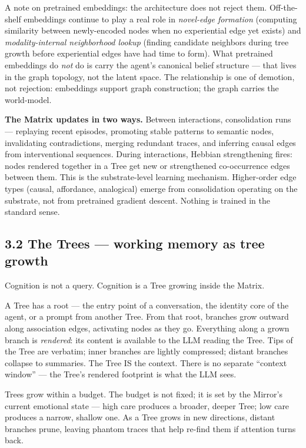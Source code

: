 \documentclass[12pt]{article}
\begin{document}
A note on pretrained embeddings: the architecture does not reject them. Off-the-shelf embeddings continue to play a real role in \emph{novel-edge formation} (computing similarity between newly-encoded nodes when no experiential edge yet exists) and \emph{modality-internal neighborhood lookup} (finding candidate neighbors during tree growth before experiential edges have had time to form). What pretrained embeddings do \emph{not} do is carry the agent's canonical belief structure --- that lives in the graph topology, not the latent space. The relationship is one of demotion, not rejection: embeddings support graph construction; the graph carries the world-model.

\textbf{The Matrix updates in two ways.} Between interactions, consolidation runs --- replaying recent episodes, promoting stable patterns to semantic nodes, invalidating contradictions, merging redundant traces, and inferring causal edges from interventional sequences. During interactions, Hebbian strengthening fires: nodes rendered together in a Tree get new or strengthened co-occurrence edges between them. This is the substrate-level learning mechanism. Higher-order edge types (causal, affordance, analogical) emerge from consolidation operating on the substrate, not from pretrained gradient descent. Nothing is trained in the standard sense.

\subsection{3.2 The Trees --- working memory as tree growth}\label{the-trees-working-memory-as-tree-growth}

Cognition is not a query. Cognition is a Tree growing inside the Matrix.

A Tree has a root --- the entry point of a conversation, the identity core of the agent, or a prompt from another Tree. From that root, branches grow outward along association edges, activating nodes as they go. Everything along a grown branch is \emph{rendered}: its content is available to the LLM reading the Tree. Tips of the Tree are verbatim; inner branches are lightly compressed; distant branches collapse to summaries. The Tree IS the context. There is no separate ``context window'' --- the Tree's rendered footprint is what the LLM sees.

Trees grow within a budget. The budget is not fixed; it is set by the Mirror's current emotional state --- high care produces a broader, deeper Tree; low care produces a narrow, shallow one. As a Tree grows in new directions, distant branches prune, leaving phantom traces that help re-find them if attention turns back.
\end{document}
